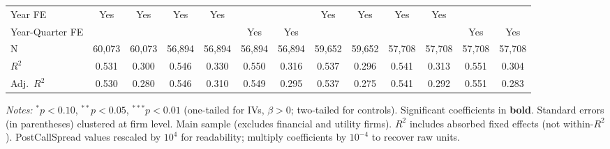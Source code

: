 \documentclass[11pt,a4paper]{article}
\begin{document}
\begin{table}[htbp]
\begin{tabular}{lcccccccccccc}
Year FE & Yes & Yes & Yes & Yes &  &  & Yes & Yes & Yes & Yes &  &  \\
Year-Quarter FE &  &  &  &  & Yes & Yes &  &  &  &  & Yes & Yes \\
\midrule
N & 60,073 & 60,073 & 56,894 & 56,894 & 56,894 & 56,894 & 59,652 & 59,652 & 57,708 & 57,708 & 57,708 & 57,708 \\
$R^2$ & 0.531 & 0.300 & 0.546 & 0.330 & 0.550 & 0.316 & 0.537 & 0.296 & 0.541 & 0.313 & 0.551 & 0.304 \\
Adj.~$R^2$ & 0.530 & 0.280 & 0.546 & 0.310 & 0.549 & 0.295 & 0.537 & 0.275 & 0.541 & 0.292 & 0.551 & 0.283 \\
\bottomrule
\end{tabular}
\begin{minipage}{\linewidth}
\vspace{2pt}\scriptsize
\textit{Notes:} $^{*}p<0.10$, $^{**}p<0.05$, $^{***}p<0.01$ (one-tailed for IVs, $\beta > 0$; two-tailed for controls).
 Significant coefficients in \textbf{bold}.
 Standard errors (in parentheses) clustered at firm level.
 Main sample (excludes financial and utility firms).
 $R^2$ includes absorbed fixed effects (not within-$R^2$).
 PostCallSpread values rescaled by $10^4$ for readability; multiply coefficients by $10^{-4}$ to recover raw units.
\end{minipage}
\end{table}
\clearpage
\end{document}
